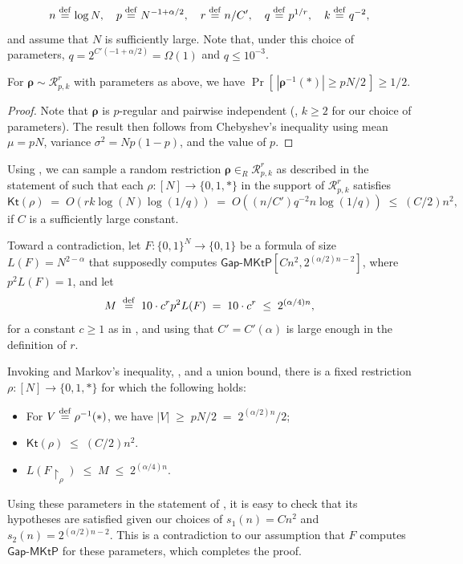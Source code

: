 \documentclass{toc}
\newcommand{\eqdef}{\stackrel{\rm def}{=}}
\newcommand{\gapmktp}{\mathsf{Gap}$-$\mathsf{MKtP}}
\newcommand{\Kt}{\mathsf{Kt}}
\begin{document}
$$
n \eqdef \log N, \quad p \eqdef N^{-1 + \alpha/2}, \quad r \eqdef n/C', \quad q \eqdef p^{1/r}, \quad k \eqdef q^{-2},
$$
and assume that $N$ is sufficiently large. 
Note that, under this choice of parameters, $q = 2^{C'(-1 + \alpha/2)} = \Omega(1)$ and $q \leq 10^{-3}$.

\begin{proposition}\label{p:stars_concentration}
For $\bm{\rho} \sim \mathcal{R}^r_{p,k}$ with parameters as above, we have $\Pr[\,|\bm{\rho}^{-1}(*)| \geq pN/2\,] \geq 1/2$.
\end{proposition}

\begin{proof}
Note that $\bm{\rho}$ is $p$-regular and pairwise independent (\ie, $k \geq 2$ for our choice of parameters). The result then follows from Chebyshev's inequality using mean $\mu = pN$, variance $\sigma^2 = Np(1-p)$, and the value of $p$.
\end{proof}

Using , we can sample a random restriction $\bm{\rho} \in_R \mathcal{R}^r_{p,k}$ as described in the statement of  such that each $\rho \colon [N] \to \{0,1,*\}$ in the support of $\mathcal{R}^r_{p,k}$ satisfies 
$$\Kt(\rho) \;=\; O(r k \log (N) \log (1/q)) \;=\; O((n/C') q^{-2} n \log (1/q)) \;\leq\; (C/2)n^2,$$
if $C$ is a sufficiently large constant.


Toward a contradiction, let $F \colon \{0,1\}^N \to \{0,1\}$ be a formula of size $L(F)=N^{2 - \alpha}$ that supposedly computes $\gapmktp[Cn^2, 2^{(\alpha/2) n - 2}]$, where $p^2 L(F) = 1$, and let 
$$M \;\eqdef\; 10 \cdot c^r p^2 L(F) \;=\;  10 \cdot c^r  \;\leq\; 2^{(\alpha/4)n},
$$
for a constant $c \geq 1$ as in , and using that $C' = C'(\alpha)$ is large enough in the definition of $r$.

Invoking  and Markov's inequality, , and a union bound, there is a fixed restriction $\rho \colon [N] \to \{0,1,*\}$ for which the following holds:
\begin{itemize}
\item For $V \eqdef \rho^{-1}(*)$, we have $|V| \;\geq\; pN/2 \;=\;2^{(\alpha/2)n}/2$;
\item $\Kt(\rho) \;\leq\; (C/2)n^2$.
\item $L(F\!\upharpoonright_\rho) \;\leq\; M \;\leq\;2^{(\alpha/4)n}$.
\end{itemize} 
Using these parameters in the statement of , it is easy to check that its hypotheses are satisfied given our choices of $s_1(n) = Cn^2$ and $s_2(n) = 2^{(\alpha/2)n - 2}$. This is a contradiction to our assumption that $F$ computes $\gapmktp$ for these parameters, which completes the proof.
\end{document}
